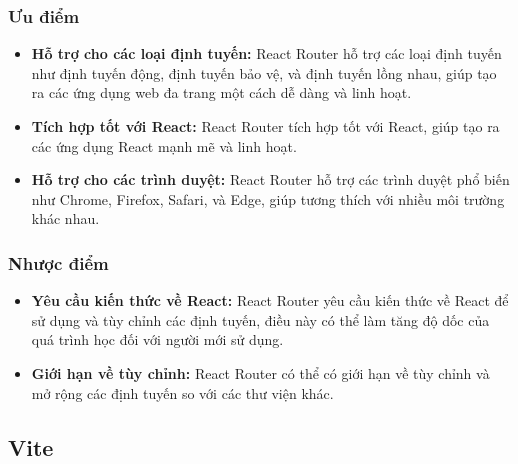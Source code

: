 \subsubsection{Ưu điểm}
\begin{itemize}
  \item \textbf{Hỗ trợ cho các loại định tuyến:} React Router hỗ trợ các loại định tuyến như định tuyến động, định tuyến bảo vệ, và định tuyến lồng nhau, giúp tạo ra các ứng dụng web đa trang một cách dễ dàng và linh hoạt.
  \item \textbf{Tích hợp tốt với React:} React Router tích hợp tốt với React, giúp tạo ra các ứng dụng React mạnh mẽ và linh hoạt.
  \item \textbf{Hỗ trợ cho các trình duyệt:} React Router hỗ trợ các trình duyệt phổ biến như Chrome, Firefox, Safari, và Edge, giúp tương thích với nhiều môi trường khác nhau.
\end{itemize}
\subsubsection{Nhược điểm}
\begin{itemize}
  \item \textbf{Yêu cầu kiến thức về React:} React Router yêu cầu kiến thức về React để sử dụng và tùy chỉnh các định tuyến, điều này có thể làm tăng độ dốc của quá trình học đối với người mới sử dụng.
  \item \textbf{Giới hạn về tùy chỉnh:} React Router có thể có giới hạn về tùy chỉnh và mở rộng các định tuyến so với các thư viện khác.
\end{itemize}
\subsection{Vite}
